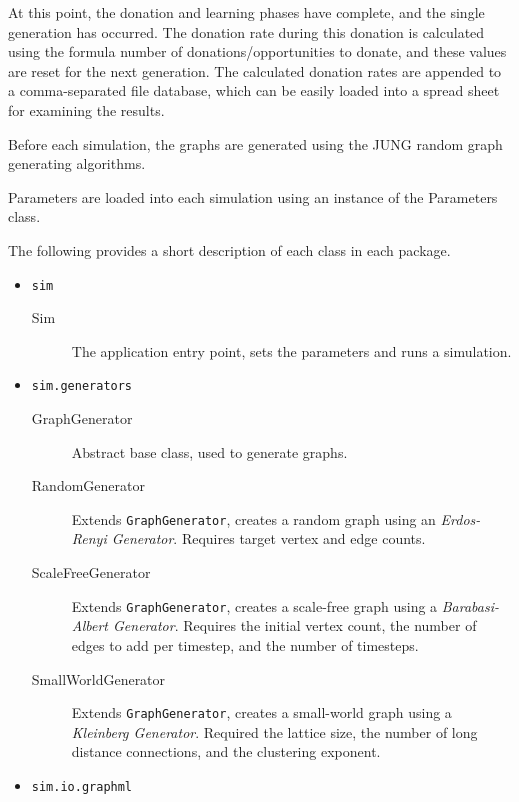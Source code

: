At this point, the donation and learning phases have complete, and the single generation has occurred. The donation rate during this donation is calculated using the formula number of donations/opportunities to donate, and these values are reset for the next generation. The calculated donation rates are appended to a comma-separated file database, which can be easily loaded into a spread sheet for examining the results.

Before each simulation, the graphs are generated using the JUNG random graph generating algorithms.

Parameters are loaded into each simulation using an instance of the Parameters class.

The following provides a short description of each class in each
package.

\begin{itemize}
    \item {\tt sim}

    \begin{description}
        \item[Sim] The application entry point, sets the parameters and
        runs a simulation.
    \end{description}

    \item {\tt sim.generators}

    \begin{description}
        \item[GraphGenerator] Abstract base class, used to generate
        graphs.
        \item[RandomGenerator] Extends {\tt GraphGenerator}, creates a
        random graph using an {\it Erdos-Renyi Generator}. Requires
        target vertex and edge counts.
        \item[ScaleFreeGenerator] Extends {\tt GraphGenerator}, creates
        a scale-free graph using a {\it Barabasi-Albert Generator}.
        Requires the initial vertex count, the number of edges to add per
        timestep, and the number of timesteps.
        \item[SmallWorldGenerator] Extends {\tt GraphGenerator}, creates
        a small-world graph using a {\it Kleinberg Generator}.
        Required the lattice size, the number of long distance connections,
        and the clustering exponent.
    \end{description}

    \item {\tt sim.io.graphml}


\end{itemize}
